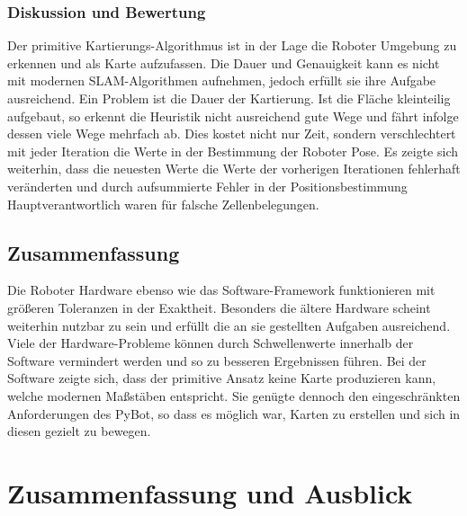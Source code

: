 \documentclass[twoside,11pt, a4paper]{report}
\begin{document}
	\subsection{Diskussion und Bewertung}
	Der primitive Kartierungs-Algorithmus ist in der Lage die Roboter Umgebung zu erkennen und als Karte aufzufassen. Die Dauer und Genauigkeit kann es nicht mit modernen SLAM-Algorithmen aufnehmen, jedoch erfüllt sie ihre Aufgabe ausreichend. Ein Problem ist die Dauer der Kartierung. Ist die Fläche kleinteilig aufgebaut, so erkennt die Heuristik nicht ausreichend gute Wege und fährt infolge dessen viele Wege mehrfach ab. Dies kostet nicht nur Zeit, sondern verschlechtert mit jeder Iteration die Werte in der Bestimmung der Roboter Pose. Es zeigte sich weiterhin, dass die neuesten Werte die Werte der vorherigen Iterationen fehlerhaft veränderten und durch aufsummierte Fehler in der Positionsbestimmung Hauptverantwortlich waren für falsche Zellenbelegungen. 
	\FloatBarrier
	\section{Zusammenfassung}
	Die Roboter Hardware ebenso wie das Software-Framework funktionieren mit größeren Toleranzen in der Exaktheit. Besonders die ältere Hardware scheint weiterhin nutzbar zu sein und erfüllt die an sie gestellten Aufgaben ausreichend. Viele der Hardware-Probleme können durch Schwellenwerte innerhalb der Software vermindert werden und so zu besseren Ergebnissen führen. Bei der Software zeigte sich, dass der primitive Ansatz keine Karte produzieren kann, welche modernen Maßstäben entspricht. Sie genügte dennoch den eingeschränkten Anforderungen des PyBot, so dass es möglich war, Karten zu erstellen und sich in diesen gezielt zu bewegen. 
	
	
	\chapter{Zusammenfassung und Ausblick}
	
\end{document}
